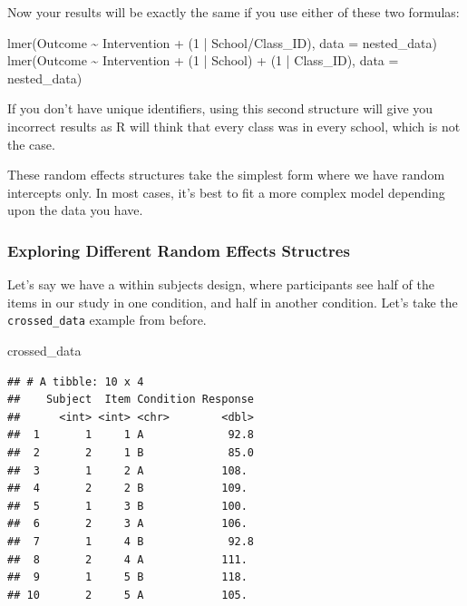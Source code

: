 \documentclass[
]{book}
\newenvironment{Shaded}{\begin{snugshade}}{\end{snugshade}}
\newcommand{\AttributeTok}[1]{\textcolor[rgb]{0.77,0.63,0.00}{#1}}
\newcommand{\DecValTok}[1]{\textcolor[rgb]{0.00,0.00,0.81}{#1}}
\newcommand{\FunctionTok}[1]{\textcolor[rgb]{0.00,0.00,0.00}{#1}}
\newcommand{\NormalTok}[1]{#1}
\newcommand{\SpecialCharTok}[1]{\textcolor[rgb]{0.00,0.00,0.00}{#1}}
\begin{document}
Now your results will be exactly the same if you use either of these two formulas:

\begin{Shaded}
\begin{Highlighting}[]
\FunctionTok{lmer}\NormalTok{(Outcome }\SpecialCharTok{\textasciitilde{}}\NormalTok{ Intervention }\SpecialCharTok{+}\NormalTok{ (}\DecValTok{1} \SpecialCharTok{|}\NormalTok{ School}\SpecialCharTok{/}\NormalTok{Class\_ID), }\AttributeTok{data =}\NormalTok{ nested\_data)}
\FunctionTok{lmer}\NormalTok{(Outcome }\SpecialCharTok{\textasciitilde{}}\NormalTok{ Intervention }\SpecialCharTok{+}\NormalTok{ (}\DecValTok{1} \SpecialCharTok{|}\NormalTok{ School) }\SpecialCharTok{+}\NormalTok{ (}\DecValTok{1} \SpecialCharTok{|}\NormalTok{ Class\_ID), }\AttributeTok{data =}\NormalTok{ nested\_data)}
\end{Highlighting}
\end{Shaded}

If you don't have unique identifiers, using this second structure will give you incorrect results as R will think that every class was in every school, which is not the case.

These random effects structures take the simplest form where we have random intercepts only. In most cases, it's best to fit a more complex model depending upon the data you have.

\hypertarget{exploring-different-random-effects-structres}{%
\subsubsection{Exploring Different Random Effects Structres}\label{exploring-different-random-effects-structres}}

Let's say we have a within subjects design, where participants see half of the items in our study in one condition, and half in another condition. Let's take the \texttt{crossed\_data} example from before.

\begin{Shaded}
\begin{Highlighting}[]
\NormalTok{crossed\_data}
\end{Highlighting}
\end{Shaded}

\begin{verbatim}
## # A tibble: 10 x 4
##    Subject  Item Condition Response
##      <int> <int> <chr>        <dbl>
##  1       1     1 A             92.8
##  2       2     1 B             85.0
##  3       1     2 A            108. 
##  4       2     2 B            109. 
##  5       1     3 B            100. 
##  6       2     3 A            106. 
##  7       1     4 B             92.8
##  8       2     4 A            111. 
##  9       1     5 B            118. 
## 10       2     5 A            105.
\end{verbatim}
\end{document}
